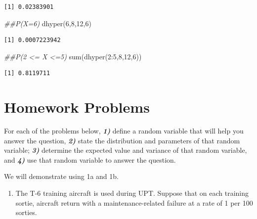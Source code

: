\documentclass[
  letterpaper,
  DIV=11,
  numbers=noendperiod]{scrreprt}
\newenvironment{Shaded}{\begin{snugshade}}{\end{snugshade}}
\newcommand{\DecValTok}[1]{\textcolor[rgb]{0.68,0.00,0.00}{#1}}
\newcommand{\DocumentationTok}[1]{\textcolor[rgb]{0.37,0.37,0.37}{\textit{#1}}}
\newcommand{\FunctionTok}[1]{\textcolor[rgb]{0.28,0.35,0.67}{#1}}
\newcommand{\NormalTok}[1]{\textcolor[rgb]{0.00,0.23,0.31}{#1}}
\newcommand{\SpecialCharTok}[1]{\textcolor[rgb]{0.37,0.37,0.37}{#1}}
\providecommand{\tightlist}{%
  \setlength{\itemsep}{0pt}\setlength{\parskip}{0pt}}\usepackage{longtable,booktabs,array}
\begin{document}
\begin{verbatim}
[1] 0.02383901
\end{verbatim}

\begin{Shaded}
\begin{Highlighting}[]
\DocumentationTok{\#\#P(X=6)}
\FunctionTok{dhyper}\NormalTok{(}\DecValTok{6}\NormalTok{,}\DecValTok{8}\NormalTok{,}\DecValTok{12}\NormalTok{,}\DecValTok{6}\NormalTok{)}
\end{Highlighting}
\end{Shaded}

\begin{verbatim}
[1] 0.0007223942
\end{verbatim}

\begin{Shaded}
\begin{Highlighting}[]
\DocumentationTok{\#\#P(2 \textless{}= X \textless{}=5)}
\FunctionTok{sum}\NormalTok{(}\FunctionTok{dhyper}\NormalTok{(}\DecValTok{2}\SpecialCharTok{:}\DecValTok{5}\NormalTok{,}\DecValTok{8}\NormalTok{,}\DecValTok{12}\NormalTok{,}\DecValTok{6}\NormalTok{))}
\end{Highlighting}
\end{Shaded}

\begin{verbatim}
[1] 0.8119711
\end{verbatim}

\section{Homework Problems}\label{homework-problems-11}

For each of the problems below, \textbf{\emph{1)}} define a random
variable that will help you answer the question, \textbf{\emph{2)}}
state the distribution and parameters of that random variable;
\textbf{\emph{3)}} determine the expected value and variance of that
random variable, and \textbf{\emph{4)}} use that random variable to
answer the question.

We will demonstrate using 1a and 1b.

\begin{enumerate}
\def\labelenumi{\arabic{enumi}.}
\tightlist
\item
  The T-6 training aircraft is used during UPT. Suppose that on each
  training sortie, aircraft return with a maintenance-related failure at
  a rate of 1 per 100 sorties.
\end{enumerate}
\end{document}
